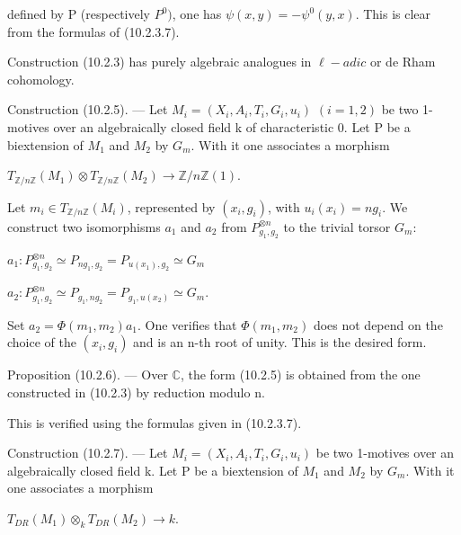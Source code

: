 \documentclass[11pt,twoside]{article}
\newcommand{\DFormula}[1]{%
  \par\smallskip\noindent\hspace*{0pt}\(\displaystyle #1\)\par\smallskip
}
\begin{document}
defined by P (respectively \(P^{0})\), one has \(\psi (x,y)=−\psi ^{0}(y,x)\). This is clear from the formulas of (10.2.3.7).\par
\par\medskip
Construction (10.2.3) has purely algebraic analogues in \(\ell -adic\) or de Rham cohomology.\par
\par\medskip
Construction (10.2.5). — Let \(M_{i}=(X_{i},A_{i},T_{i},G_{i},u_{i})\) \((i=1,2)\) be two 1-motives over an algebraically closed field k of characteristic 0. Let P be a biextension of \(M_{1}\) and \(M_{2}\) by \(G_{m}\). With it one associates a morphism\par
\par\medskip
\DFormula{T_{\mathbb{Z}/n\mathbb{Z}}(M_{1})\otimes T_{\mathbb{Z}/n\mathbb{Z}}(M_{2})\to \mathbb{Z}/n\mathbb{Z}(1).}
\par\medskip
Let \(m_{i}\in T_{\mathbb{Z}/n\mathbb{Z}}(M_{i})\), represented by \((x_{i},g_{i})\), with \(u_{i}(x_{i})=ng_{i}\). We construct two isomorphisms \(a_{1}\) and \(a_{2}\) from \(P_{g_{1},g_{2}}^{\otimes n}\) to the trivial torsor \(G_{m}\):\par
\par\medskip
\DFormula{a_{1}:P_{g_{1},g_{2}}^{\otimes n}\simeq P_{ng_{1},g_{2}}=P_{u(x_{1}),g_{2}}\simeq G_{m}}
\DFormula{a_{2}:P_{g_{1},g_{2}}^{\otimes n}\simeq P_{g_{1},ng_{2}}=P_{g_{1},u(x_{2})}\simeq G_{m}.}
\par\medskip
Set \(a_{2}=\Phi (m_{1},m_{2})a_{1}\). One verifies that \(\Phi (m_{1},m_{2})\) does not depend on the choice of the \((x_{i},g_{i})\) and is an n-th root of unity. This is the desired form.\par
\par\medskip
Proposition (10.2.6). — Over \(\mathbb{C}\), the form (10.2.5) is obtained from the one constructed in (10.2.3) by reduction modulo n.\par
\par\medskip
This is verified using the formulas given in (10.2.3.7).\par
\par\medskip
Construction (10.2.7). — Let \(M_{i}=(X_{i},A_{i},T_{i},G_{i},u_{i})\) be two 1-motives over an algebraically closed field k. Let P be a biextension of \(M_{1}\) and \(M_{2}\) by \(G_{m}\). With it one associates a morphism\par
\par\medskip
\DFormula{T_{DR}(M_{1})\otimes _{k}T_{DR}(M_{2})\to k.}
\par\medskip
\end{document}
